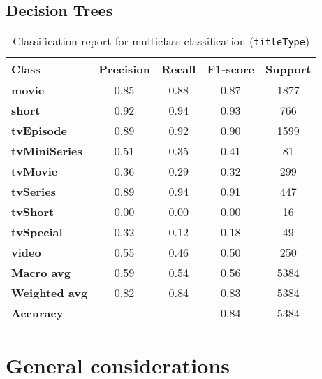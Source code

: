 \subsection*{Decision Trees}
\begin{table}[H]
    \centering
    \begin{tabular}{lcccc}
        \toprule
        \bf{Class} & \bf{Precision} & \bf{Recall} & \bf{F1-score} & \bf{Support} \\
        \midrule
        \bf{movie}         & 0.85 & 0.88 & 0.87 & 1877 \\
        \bf{short}         & 0.92 & 0.94 & 0.93 & 766 \\
        \bf{tvEpisode}     & 0.89 & 0.92 & 0.90 & 1599 \\
        \bf{tvMiniSeries}  & 0.51 & 0.35 & 0.41 & 81 \\
        \bf{tvMovie}       & 0.36 & 0.29 & 0.32 & 299 \\
        \bf{tvSeries}      & 0.89 & 0.94 & 0.91 & 447 \\
        \bf{tvShort}       & 0.00 & 0.00 & 0.00 & 16 \\
        \bf{tvSpecial}     & 0.32 & 0.12 & 0.18 & 49 \\
        \bf{video}         & 0.55 & 0.46 & 0.50 & 250 \\
        \midrule
        \bf{Macro avg}     & 0.59 & 0.54 & 0.56 & 5384 \\
        \bf{Weighted avg}  & 0.82 & 0.84 & 0.83 & 5384 \\
        \midrule
        \bf{Accuracy}      &      &      & 0.84 & 5384 \\
        \bottomrule
    \end{tabular}
    \caption{Classification report for multiclass classification (\texttt{titleType})}
    \label{tab:multiclass_classification_report}
\end{table}




\section{General considerations}\label{sec:general_considerations}
